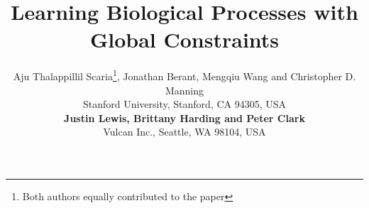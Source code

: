 \documentclass[11pt,letterpaper]{article}
\title{Learning Biological Processes with Global Constraints}
\author{\small{Aju Thalappillil Scaria\thanks{\hspace{5pt}Both authors equally contributed to the paper}, Jonathan Berant\samethanks, Mengqiu Wang and Christopher D. Manning}  \\
 			\small{Stanford University, Stanford, CA 94305, USA} \\ 
			\small{\textbf{Justin Lewis, Brittany Harding and Peter Clark}} \\
			\small{Vulcan Inc., Seattle, WA 98104, USA} \\
}
\begin{document}
\maketitle

 
 \label{sec:intro}
 \label{sec:process}
 \label{sec:model}
 \label{sec:experiment}
 \label{sec:related}
 \label{sec:conclusion}




\end{document}
